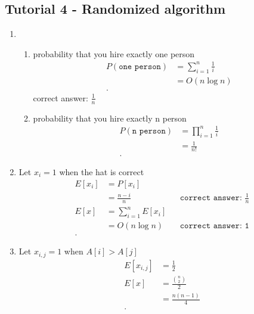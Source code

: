 \documentclass[../../main/main.tex]{subfiles}
\begin{document}
\subsection{Tutorial 4 - Randomized algorithm}
\begin{enumerate}
  \item \begin{enumerate}
    \item  probability that you hire exactly one person
      \begin{align*}
        P(\texttt{one person}) &= \sum^{n}_{i=1} \frac{1}{i} \\
        &= O(n\log n) \\
      .\end{align*}
      correct answer: $\frac{1}{n}$
    \item  probability that you hire exactly n person
      \begin{align*}
        P(\texttt{n person}) &= \prod^{n}_{i=1} \frac{1}{i} \\
        &= \frac{1}{n!} \\
      .\end{align*}
  \end{enumerate}
\item 
  Let $x_i=1$ when the hat is correct
  \begin{align*}
    E[x_i] &= P[x_i] \\ 
           &= \frac{n-i}{n} && \texttt{correct answer: $\frac{1}{n}$}\\
    E[x] &= \sum^{n}_{i=1} E[x_i] \\
         &= O(n \log n) && \texttt{correct answer: 1}\\
  .\end{align*}
\item 
  Let $x_{i,j}= 1$ when $A[i] > A[j]$
  \begin{align*}
    E[x_{i,j}] &= \frac{1}{2} \\
    E[x] &=  \frac{{n \choose 2}}{2} \\
    &= \frac{n(n-1)}{4} \\
  .\end{align*}

\end{enumerate}
\end{document}
